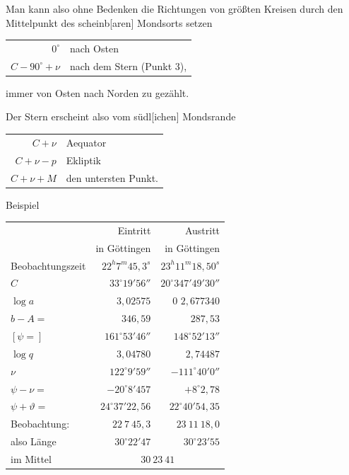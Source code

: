 \documentclass[12pt,a4paper]{article}
\theoremstyle{plain}
\theoremstyle{definition}
\theoremstyle{remark}
\begin{document}
Man kann also ohne Bedenken die Richtungen von gr\"o\ss ten Kreisen durch den Mittelpunkt des scheinb[aren] Mondsorts setzen
\begin{center}
\begin{tabular}{r@{\ldots\ }l}
$0^{\circ}$ & nach Osten \\
$C - 90^{\circ} + \nu$ & nach dem Stern (Punkt 3),
\end{tabular}
\end{center}
immer von Osten nach Norden zu gez\"ahlt.

\newpage

Der Stern erscheint also vom s\"udl[ichen] Mondsrande
\begin{center}
\begin{tabular}{r@{\ nach Osten in Bez[ug] auf }l}
$C + \nu$ & Aequator \\
$C + \nu - p$ & Ekliptik \\
$C + \nu + M$ & den untersten Punkt.
\end{tabular}
\end{center}

Beispiel
\begin{center}
\begin{tabular}{l@{\quad}r@{\quad}r}
& Eintritt & Austritt \\
& in G\"ottingen & in G\"ottingen \\
Beobachtungszeit & $22^h7^m45{,}3^s$ & $23^h11^m18{,}50^s$ \\
$C$ & $33^{\circ}19'56''$ & $20^{\circ}347'49'30''$ \\
$\log a$ & $3{,}02575$ & $0$ \quad $2{,}677340$ \\
$b - A =$ & $346{,}59$ & $287{,}53$ \\
$[\psi =]$ & $161^{\circ}53'46''$ & $148^{\circ}52'13''$ \\
$\log q$ & $3{,}04780$ & $2{,}74487$ \\
$\nu$ & $122^{\circ}9'59''$ & $-111^{\circ}40'0''$ \\
$\psi - \nu =$ & $-20^{\circ}8'457$ & $+8^{\circ}2{,}78$ \\
$\psi + \vartheta =$ & $24^{\circ}37'22{,}56$ & $22^{\circ}40'54{,}35$ \\
Beobachtung: & $22\ 7\ 45{,}3$ & $23\ 11\ 18{,}0$ \\
also L\"ange & $30^{\circ}22'47$ & $30^{\circ}23'55$ \\
im Mittel & \multicolumn{2}{c}{$30\ 23\ 41$}.
\end{tabular}
\end{center}
\end{document}
